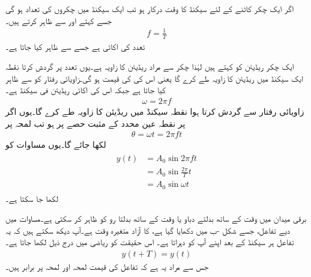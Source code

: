 اگر ایک چکر کاٹنے کے لئے  سیکنڈ کا وقت درکار ہو تب ایک سیکنڈ میں چکروں کی تعداد   ہو گی جسے  کہتے اور  سے ظاہر کرتے ہیں۔
\begin{align}
f=\frac{1}{T}
\end{align}
تعدد کی اکائی  ہے جسے  سے ظاہر کیا جاتا ہے۔

ایک چکر  ریڈیئن کو کہتے ہیں لہٰذا  چکر سے مراد  ریڈیئن کا زاویہ ہے۔یوں  تعدد پر گردش کرتا نقطہ ایک سیکنڈ میں  ریڈیئن کا زاویہ طے کرے گا یعنی اس کی  کی قیمت  ہو گی۔زاویائی رفتار کو  سے ظاہر کیا جاتا ہے جبکہ اس کی اکائی ریڈیئن فی سیکنڈ  ہے۔
\begin{align}
\omega=2\pi f
\end{align}
زاویائی رفتار  سے گردش کرتا ہوا نقطہ  سیکنڈ میں  ریڈیئن کا زاویہ طے کرے گا۔یوں اگر  پر نقطہ عین  محدد کے مثبت حصے پر ہو تب لمحہ  پر
\begin{align}
\theta=\omega t=2\pi f t
\end{align}
لکھا جائے گا۔یوں مساوات   کو
\begin{gather}
\begin{aligned}\label{مساوات_بدلتا_سائن_نما_تفاعل_ب}
y(t)&=A_0 \sin 2\pi f t\\
&=A_0\sin \frac{2\pi}{T}t\\
&=A_0 \sin \omega t
\end{aligned}
\end{gather}
لکھا جا سکتا ہے۔

برقی میدان میں  وقت کے ساتھ بدلتے دباو یا وقت کے ساتھ بدلتا رو کو ظاہر کر سکتی ہے۔مساوات  میں دیے تفاعل، جسے شکل -ب میں دکھایا گیا ہے،  کا آزاد متغیرہ وقت  ہے۔آپ دیکھ سکتے ہیں کہ یہ تفاعل ہر  سیکنڈ کے بعد اپنے آپ کو دہراتا ہے۔ اس حقیقت کو ریاضی میں درج ذیل لکھا جاتا ہے۔
\begin{align}
y(t+T)=y( t)
\end{align}
جس سے مراد یہ ہے کہ تفاعل کی قیمت لمحہ  اور لمحہ  پر برابر ہیں۔

